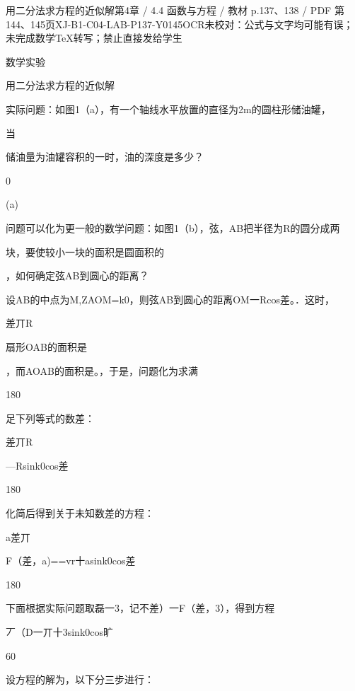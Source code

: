 \begin{bankitem}{用二分法求方程的近似解}{第4章 / 4.4 函数与方程 / 教材 p.137、138 / PDF 第144、145页}{XJ-B1-C04-LAB-P137-Y0145}{OCR未校对：公式与文字均可能有误；未完成数学TeX转写；禁止直接发给学生}
\begin{ocrdraft}
\par
数学实验
\par
用二分法求方程的近似解
\par
实际问题：如图1（a），有一个轴线水平放置的直径为2m的圆柱形储油罐，
\par
当
\par
储油量为油罐容积的一时，油的深度是多少？
\par
0
\par
(a)
\par
问题可以化为更一般的数学问题：如图1（b），弦，AB把半径为R的圆分成两
\par
块，要使较小一块的面积是圆面积的
\par
，如何确定弦AB到圆心的距离？
\par
设AB的中点为M,ZAOM=k0，则弦AB到圆心的距离OM一Rcos差。．这时，
\par
差丌R
\par
扇形OAB的面积是
\par
，而AOAB的面积是。，于是，问题化为求满
\par
180
\par
足下列等式的数差：
\par
差丌R
\par
—Rsink0cos差
\par
180
\par
化简后得到关于未知数差的方程：
\par
a差丌
\par
F（差，a)==vr十asink0cos差
\par
180
\par
下面根据实际问题取磊一3，记不差）一F（差，3），得到方程
\par
丆（D一丌十3sink0cos旷
\par
60
\par
设方程的解为，以下分三步进行：
\par

\end{ocrdraft}
\end{bankitem}
